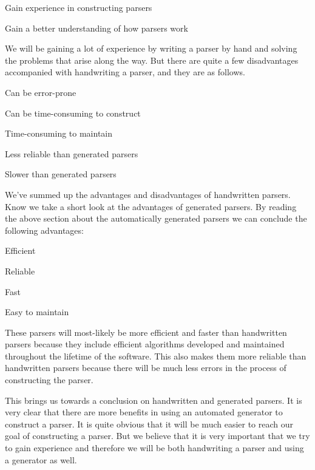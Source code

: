 \begin{dlist}
\item Gain experience in constructing parsers
\item Gain a better understanding of how parsers work
\end{dlist}

We will be gaining a lot of experience by writing a parser by hand and solving the problems that arise along the way. But there are quite a few disadvantages accompanied with handwriting a parser, and they are as follows.

\begin{dlist}
\item Can be error-prone
\item Can be time-consuming to construct
\item Time-consuming to maintain
\item Less reliable than generated parsers
\item Slower than generated parsers
\end{dlist}

We've summed up the advantages and disadvantages of handwritten parsers. Know we take a short look at the advantages of generated parsers. By reading the above section about the automatically generated parsers we can conclude the following advantages:

\begin{dlist}
\item Efficient
\item Reliable
\item Fast
\item Easy to maintain
\end{dlist}

These parsers will most-likely be more efficient and faster than handwritten parsers because they include efficient algorithms developed and maintained throughout the lifetime of the software. This also makes them more reliable than handwritten parsers because there will be much less errors in the process of constructing the parser.

This brings us towards a conclusion on handwritten and generated parsers. It is very clear that there are more benefits in using an automated generator to construct a parser. It is quite obvious that it will be much easier to reach our goal of constructing a parser. But we believe that it is very important that we try to gain experience and therefore we will be both handwriting a parser and using a generator as well.